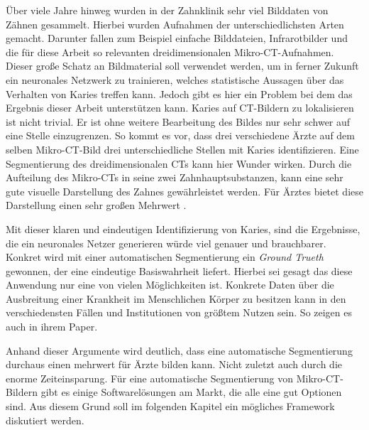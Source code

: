 Über viele Jahre hinweg wurden in der Zahnklinik sehr viel Bilddaten von Zähnen gesammelt.
Hierbei wurden Aufnahmen der unterschiedlichsten Arten gemacht. Darunter fallen zum
Beispiel einfache Bilddateien, Infrarotbilder und die für diese Arbeit so
relevanten dreidimensionalen Mikro-CT-Aufnahmen. Dieser große Schatz an Bildmaterial
soll verwendet werden, um in ferner Zukunft ein neuronales Netzwerk zu
trainieren, welches statistische Aussagen über das Verhalten von Karies treffen kann.
Jedoch gibt es hier ein Problem bei dem das Ergebnis dieser Arbeit unterstützen
kann. Karies auf \ac{CT}-Bildern zu lokalisieren ist nicht trivial. Er ist ohne weitere
Bearbeitung des Bildes nur sehr schwer auf eine Stelle einzugrenzen. So kommt es
vor, dass drei verschiedene Ärzte auf dem selben Mikro-\ac{CT}-Bild drei
unterschiedliche Stellen mit Karies identifizieren. Eine Segmentierung des dreidimensionalen
\ac{CT}s kann hier Wunder wirken. Durch die Aufteilung des Mikro-\ac{CT}s in
seine zwei Zahnhauptsubstanzen, kann eine sehr gute visuelle Darstellung des Zahnes
gewährleistet werden. Für Ärztes bietet diese Darstellung einen sehr großen
Mehrwert \citep[vgl.][S. 1]{walter2025projekt}.

Mit dieser klaren und eindeutigen Identifizierung von Karies, sind die
Ergebnisse, die ein neuronales Netzer generieren würde viel genauer und brauchbarer.
Konkret wird mit einer automatischen Segmentierung ein \textit{Ground Trueth} gewonnen,
der eine eindeutige Basiswahrheit liefert. Hierbei sei gesagt das diese Anwendung
nur eine von vielen Möglichkeiten ist. Konkrete Daten über die Ausbreitung einer
Krankheit im Menschlichen Körper zu besitzen kann in den verschiedensten Fällen
und Institutionen von größtem Nutzen sein. So zeigen es auch \citet{de20083d} in
ihrem Paper.

Anhand dieser Argumente wird deutlich, dass eine automatische Segmentierung durchaus
einen mehrwert für Ärzte bilden kann. Nicht zuletzt auch durch die enorme
Zeiteinsparung. Für eine automatische Segmentierung von Mikro-\ac{CT}-Bildern
gibt es einige Softwarelösungen am Markt, die alle eine gut Optionen sind. Aus
diesem Grund soll im folgenden Kapitel ein mögliches Framework diskutiert werden.


